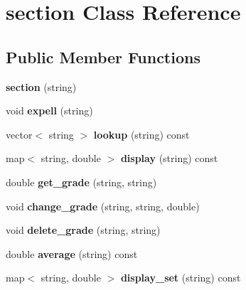 \hypertarget{classsection}{}\section{section Class Reference}
\label{classsection}
\subsection*{Public Member Functions}
\begin{DoxyCompactItemize}
\item 
{\bfseries section} (string)\hypertarget{classsection_aeae7eca8657c2e062ba7bd483e89a8c9}{}\label{classsection_aeae7eca8657c2e062ba7bd483e89a8c9}

\item 
void {\bfseries expell} (string)\hypertarget{classsection_a37702c24ae3024eaf940203bbe6c56a6}{}\label{classsection_a37702c24ae3024eaf940203bbe6c56a6}

\item 
vector$<$ string $>$ {\bfseries lookup} (string) const \hypertarget{classsection_a9c56da4256e188c1bcb68690cbed9fcb}{}\label{classsection_a9c56da4256e188c1bcb68690cbed9fcb}

\item 
map$<$ string, double $>$ {\bfseries display} (string) const \hypertarget{classsection_aff2272beb157394456021c868ec57153}{}\label{classsection_aff2272beb157394456021c868ec57153}

\item 
double {\bfseries get\+\_\+grade} (string, string)\hypertarget{classsection_a10402877e174c8fade2d6764d08a2d3a}{}\label{classsection_a10402877e174c8fade2d6764d08a2d3a}

\item 
void {\bfseries change\+\_\+grade} (string, string, double)\hypertarget{classsection_af2086f1f7f5c02b5b8c98d042bfcb23f}{}\label{classsection_af2086f1f7f5c02b5b8c98d042bfcb23f}

\item 
void {\bfseries delete\+\_\+grade} (string, string)\hypertarget{classsection_aa8ff29975cd6a290a0991b806690dfe7}{}\label{classsection_aa8ff29975cd6a290a0991b806690dfe7}

\item 
double {\bfseries average} (string) const \hypertarget{classsection_af7ff4fcc38ba8a24247f0e750f8024c6}{}\label{classsection_af7ff4fcc38ba8a24247f0e750f8024c6}

\item 
map$<$ string, double $>$ {\bfseries display\+\_\+set} (string) const \hypertarget{classsection_a9988b1ef82fd58320d76982d824e86fc}{}\label{classsection_a9988b1ef82fd58320d76982d824e86fc}


\end{DoxyCompactItemize}
